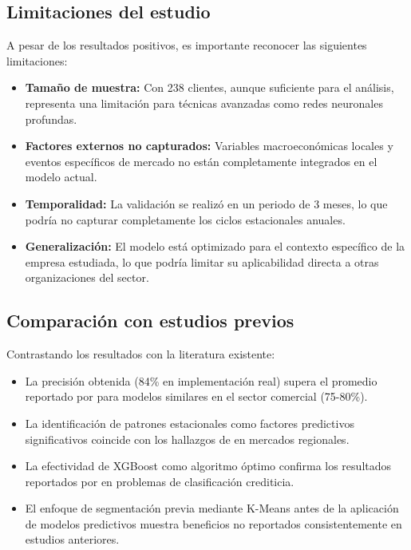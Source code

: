 \subsection{Limitaciones del estudio}
A pesar de los resultados positivos, es importante reconocer las siguientes limitaciones:

\begin{itemize}
    \item \textbf{Tamaño de muestra:} Con 238 clientes, aunque suficiente para el análisis, representa una limitación para técnicas avanzadas como redes neuronales profundas.
    
    \item \textbf{Factores externos no capturados:} Variables macroeconómicas locales y eventos específicos de mercado no están completamente integrados en el modelo actual.
    
    \item \textbf{Temporalidad:} La validación se realizó en un periodo de 3 meses, lo que podría no capturar completamente los ciclos estacionales anuales.
    
    \item \textbf{Generalización:} El modelo está optimizado para el contexto específico de la empresa estudiada, lo que podría limitar su aplicabilidad directa a otras organizaciones del sector.
\end{itemize}

\subsection{Comparación con estudios previos}
Contrastando los resultados con la literatura existente:

\begin{itemize}
    \item La precisión obtenida (84\% en implementación real) supera el promedio reportado por \cite{garcia2024machine} para modelos similares en el sector comercial (75-80\%).
    
    \item La identificación de patrones estacionales como factores predictivos significativos coincide con los hallazgos de \cite{ramirez2023predictive} en mercados regionales.
    
    \item La efectividad de XGBoost como algoritmo óptimo confirma los resultados reportados por \cite{torres2023inteligencia} en problemas de clasificación crediticia.
    
    \item El enfoque de segmentación previa mediante K-Means antes de la aplicación de modelos predictivos muestra beneficios no reportados consistentemente en estudios anteriores.
\end{itemize}

